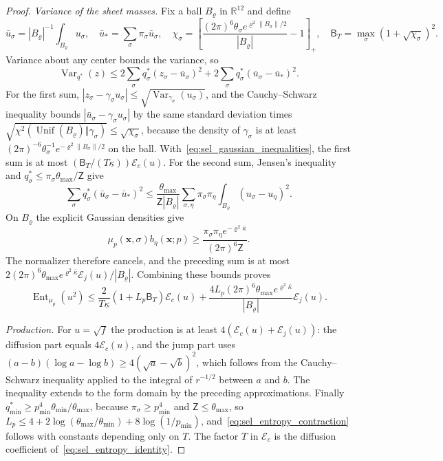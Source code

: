 \begin{proof}
\emph{Variance of the sheet masses.} Fix a ball $B_\varrho$ in $\mathbb R^{12}$ and define
\[
\bar u_\sigma=|B_\varrho|^{-1}\int_{B_\varrho}u_\sigma,\quad
\bar u_*=\sum_\sigma\pi_\sigma\bar u_\sigma,\quad
\chi_\sigma=\left[\frac{(2\pi)^6\theta_\sigma e^{\varrho^2\|B_\sigma\|/2}}{|B_\varrho|}-1\right]_+,\quad
\mathsf B_T=\max_\sigma(1+\sqrt{\chi_\sigma})^2.
\]
Variance about any center bounds the variance, so
\[
\operatorname{Var}_{q^*}(z)\le2\sum_\sigma q^*_\sigma(z_\sigma-\bar u_\sigma)^2+2\sum_\sigma q^*_\sigma(\bar u_\sigma-\bar u_*)^2.
\]
For the first sum, $|z_\sigma-\gamma_\sigma u_\sigma|\le\sqrt{\operatorname{Var}_{\gamma_\sigma}(u_\sigma)}$, and the Cauchy--Schwarz inequality bounds $|\bar u_\sigma-\gamma_\sigma u_\sigma|$ by the same standard deviation times $\sqrt{\chi^2(\operatorname{Unif}(B_\varrho)\Vert\gamma_\sigma)}\le\sqrt{\chi_\sigma}$, because the density of $\gamma_\sigma$ is at least $(2\pi)^{-6}\theta_\sigma^{-1}e^{-\varrho^2\|B_\sigma\|/2}$ on the ball. With~\eqref{eq:sel_gaussian_inequalities}, the first sum is at most $(\mathsf B_T/(T\underline\kappa))\mathcal E_c(u)$. For the second sum, Jensen's inequality and $q^*_\sigma\le\pi_\sigma\theta_{\max}/\mathsf Z$ give
\[
\sum_\sigma q^*_\sigma(\bar u_\sigma-\bar u_*)^2\le\frac{\theta_{\max}}{\mathsf Z|B_\varrho|}\sum_{\sigma,\eta}\pi_\sigma\pi_\eta\int_{B_\varrho}(u_\sigma-u_\eta)^2.
\]
On $B_\varrho$ the explicit Gaussian densities give
\[
\mu_p(\mathbf x,\sigma)b_\eta(\mathbf x;p)\ge\frac{\pi_\sigma\pi_\eta e^{-\varrho^2\bar\kappa}}{(2\pi)^6\mathsf Z}.
\]
The normalizer therefore cancels, and the preceding sum is at most $2(2\pi)^6\theta_{\max}e^{\varrho^2\bar\kappa}\mathcal E_j(u)/|B_\varrho|$. Combining these bounds proves
\[
\operatorname{Ent}_{\mu_p}(u^2)\le\frac2{T\underline\kappa}(1+L_p\mathsf B_T)\mathcal E_c(u)+\frac{4L_p(2\pi)^6\theta_{\max}e^{\varrho^2\bar\kappa}}{|B_\varrho|}\mathcal E_j(u).
\]

\emph{Production.} For $u=\sqrt f$ the production is at least $4(\mathcal E_c(u)+\mathcal E_j(u))$: the diffusion part equals $4\mathcal E_c(u)$, and the jump part uses $(a-b)(\log a-\log b)\ge4(\sqrt a-\sqrt b)^2$, which follows from the Cauchy--Schwarz inequality applied to the integral of $r^{-1/2}$ between $a$ and $b$. The inequality extends to the form domain by the preceding approximations. Finally $q^*_{\min}\ge p_{\min}^4\theta_{\min}/\theta_{\max}$, because $\pi_\sigma\ge p_{\min}^4$ and $\mathsf Z\le\theta_{\max}$, so $L_p\le4+2\log(\theta_{\max}/\theta_{\min})+8\log(1/p_{\min})$, and~\eqref{eq:sel_entropy_contraction} follows with constants depending only on $T$. The factor $T$ in $\mathcal E_c$ is the diffusion coefficient of~\eqref{eq:sel_entropy_identity}.
\end{proof}


